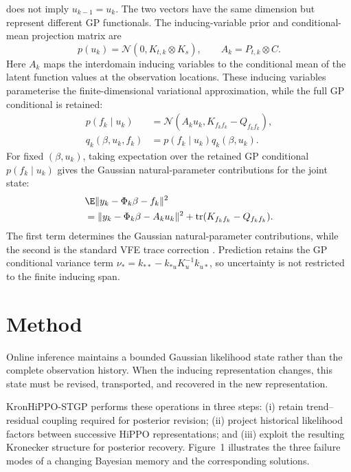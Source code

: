 \documentclass[twoside]{article}
\begin{document}
does not imply $u_{k-1}=u_k$. The two vectors have the same dimension but represent different GP functionals. The inducing-variable prior and conditional-mean projection matrix are
\begin{equation}
 p(u_k)=\mathcal N(0,K_{t,k}\otimes K_s),
 \qquad A_k=P_{t,k}\otimes C.
 \label{eq:inducing}
\end{equation}
Here $A_k$ maps the interdomain inducing variables to the conditional mean of the latent function values at the observation locations. These inducing variables parameterise the finite-dimensional variational approximation, while the full GP conditional is retained:
\begin{align}
 p(f_k\mid u_k)&=\mathcal N(A_ku_k,K_{f_kf_k}-Q_{f_kf_k}),\\
 q_k(\beta,u_k,f_k)&=p(f_k\mid u_k)q_k(\beta,u_k).
 \label{eq:vfe-family}
\end{align}
For fixed $(\beta,u_k)$, taking expectation over the retained GP conditional
$p(f_k\mid u_k)$ gives the Gaussian natural-parameter contributions for the joint state:
\begin{equation}
\begin{aligned}
 &\E\|y_k-\Phi_k\beta-f_k\|^2 \\
 &=\|y_k-\Phi_k\beta-A_ku_k\|^2
 +\operatorname{tr}(K_{f_kf_k}-Q_{f_kf_k}).
\end{aligned}
\label{eq:vfe-square}
\end{equation}
The first term determines the Gaussian natural-parameter contributions, while the second is the standard VFE trace correction \citep{Titsias2009}. Prediction retains the GP conditional variance term
$\nu_*=k_{**}-k_{*u}K_u^{-1}k_{u*}$, so uncertainty is not restricted to the finite inducing span.

\section{Method}

Online inference maintains a bounded Gaussian likelihood state rather than the complete observation history. When the inducing representation changes, this state must be revised, transported, and recovered in the new representation.

KronHiPPO-STGP performs these operations in three steps: (i) retain trend--residual coupling required for posterior revision; (ii) project historical likelihood factors between successive HiPPO representations; and (iii) exploit the resulting Kronecker structure for posterior recovery. Figure~1 illustrates the three failure modes of a changing Bayesian memory and the corresponding solutions.
\end{document}
